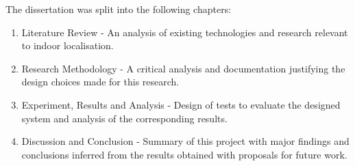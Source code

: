 The dissertation was split into the following chapters:
\begin{enumerate}
    \item Literature Review - An analysis of existing technologies and research relevant to indoor localisation.
    \item Research Methodology - A critical analysis and documentation justifying the design choices made for this research.
    \item Experiment, Results and Analysis - Design of tests to evaluate the designed system and analysis of the corresponding results.
    \item Discussion and Conclusion - Summary of this project with major findings and conclusions inferred from the results obtained with proposals for future work.
\end{enumerate}